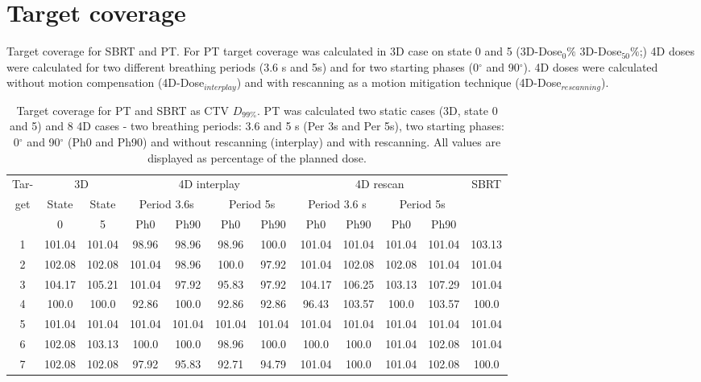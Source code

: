 \newpage
\section{Target coverage}

Target coverage for SBRT and PT. For PT target coverage was calculated in 3D case on state 0 and 5 (3D-Dose${_0\%}$ 3D-Dose${_50\%}$;) 
4D doses were calculated for two different breathing periods (3.6 s and 5s)
and for two starting phases (0$^\circ$ and 90$^\circ$). 4D doses were calculated without motion compensation (4D-Dose$_{interplay}$) 
and with rescanning as a motion mitigation technique (4D-Dose$_{rescanning}$).

\begin{table}[H]
  \centering
  \footnotesize
  \caption{Target coverage for PT and SBRT as CTV $D_{99\%}$. PT was calculated two static cases (3D, state 0 and 5) and 8 4D cases - two breathing periods: 3.6 and 5 s (Per 3s and Per 5s),
  two starting phases: 0$^\circ$ and 90$^\circ$ (Ph0 and Ph90) and without rescanning (interplay) and with rescanning. All values are displayed as percentage of the planned dose.}
  \begin{tabular}{|c|c|c|c|c|c|c|c|c|c|c|c|}
  \hline
 Tar- & \multicolumn{2}{|c|}{3D} & \multicolumn{4}{|c|}{4D interplay} & \multicolumn{4}{|c|}{4D rescan} & \multirow{3}{*}{SBRT} \\ 
  get & State & State & \multicolumn{2}{|c|}{Period 3.6s} & \multicolumn{2}{|c|}{Period 5s} & \multicolumn{2}{|c|}{Period 3.6 s} & \multicolumn{2}{|c|}{Period 5s} & \\
  &   0 &  5   & Ph0 & Ph90 & Ph0 & Ph90 & Ph0 & Ph90 & Ph0 & Ph90 & \\
 \hline \hline 
1 & 101.04 & 101.04 & 98.96 & 98.96 & 98.96 & 100.0 & 101.04 & 101.04 & 101.04 & 101.04 & 103.13\\
2 & 102.08 & 102.08 & 101.04 & 98.96 & 100.0 & 97.92 & 101.04 & 102.08 & 102.08 & 101.04 & 101.04\\
3 & 104.17 & 105.21 & 101.04 & 97.92 & 95.83 & 97.92 & 104.17 & 106.25 & 103.13 & 107.29 & 101.04\\
4 & 100.0 & 100.0 & 92.86 & 100.0 & 92.86 & 92.86 & 96.43 & 103.57 & 100.0 & 103.57 & 100.0\\
5 & 101.04 & 101.04 & 101.04 & 101.04 & 101.04 & 101.04 & 101.04 & 101.04 & 101.04 & 101.04 & 101.04\\
6 & 102.08 & 103.13 & 100.0 & 100.0 & 98.96 & 100.0 & 100.0 & 100.0 & 101.04 & 102.08 & 101.04\\
7 & 102.08 & 102.08 & 97.92 & 95.83 & 92.71 & 94.79 & 101.04 & 100.0 & 101.04 & 102.08 & 100.0\\

\end{tabular}
\end{table}

